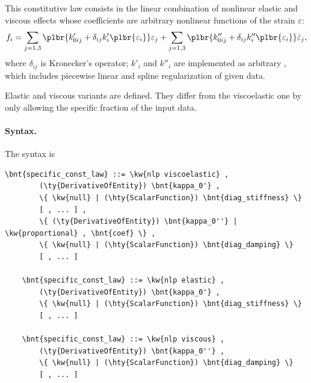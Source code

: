This constitutive law consists in the linear combination
of nonlinear elastic and viscous effects whose coefficients
are arbitrary nonlinear functions of the strain $\varepsilon$:
\begin{equation}
	f_i = \sum_{j=1,3} \plbr{
		k'_{0ij} + \delta_{ij} k_i'\plbr{\varepsilon_i}
	} \varepsilon_j
	+ \sum_{j=1,3} \plbr{
		k''_{0ij} + \delta_{ij} k''_i\plbr{\varepsilon_i}
	} \dot{\varepsilon}_j ,
	\label{eq:nlp-cl}
\end{equation}
where $\delta_{ij}$ is Kronecker's operator;
$k'_i$ and $k''_i$ are implemented as arbitrary
,
which includes piecewise linear and spline regularization
of given data.

Elastic and viscous variants are defined.
They differ from the viscoelastic one by only allowing
the specific fraction of the input data.

\paragraph{Syntax.}
The syntax is
\begin{Verbatim}[commandchars=\\\{\}]
    \bnt{specific_const_law} ::= \kw{nlp viscoelastic} ,
        (\ty{DerivativeOfEntity}) \bnt{kappa_0'} ,
        \{ \kw{null} | (\hty{ScalarFunction}) \bnt{diag_stiffness} \}
        [ , ... ] ,
        \{ (\ty{DerivativeOfEntity}) \bnt{kappa_0''} | \kw{proportional} , \bnt{coef} \} ,
        \{ \kw{null} | (\hty{ScalarFunction}) \bnt{diag_damping} \}
        [ , ... ]

    \bnt{specific_const_law} ::= \kw{nlp elastic} ,
        (\ty{DerivativeOfEntity}) \bnt{kappa_0'} ,
        \{ \kw{null} | (\hty{ScalarFunction}) \bnt{diag_stiffness} \}
        [ , ... ]

    \bnt{specific_const_law} ::= \kw{nlp viscous} ,
        (\ty{DerivativeOfEntity}) \bnt{kappa_0''} ,
        \{ \kw{null} | (\hty{ScalarFunction}) \bnt{diag_damping} \}
        [ , ... ]
\end{Verbatim}


